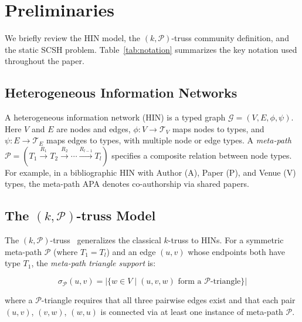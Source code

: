 \section{Preliminaries}

We briefly review the HIN model, the $(k,\mathcal{P})$-truss community definition, and the static SCSH problem. Table~\ref{tab:notation} summarizes the key notation used throughout the paper.

\subsection{Heterogeneous Information Networks}

A heterogeneous information network (HIN) is a typed graph $\mathcal{G} = (V,E,\phi,\psi)$. Here $V$ and $E$ are nodes and edges, $\phi:V\rightarrow\mathcal{T}_V$ maps nodes to types, and $\psi:E\rightarrow\mathcal{T}_E$ maps edges to types, with multiple node or edge types. A \emph{meta-path} $\mathcal{P} = (T_1 \xrightarrow{R_1} T_2 \xrightarrow{R_2} \cdots \xrightarrow{R_{l-1}} T_l)$ specifies a composite relation between node types. For example, in a bibliographic HIN with Author (A), Paper (P), and Venue (V) types, the meta-path APA denotes co-authorship via shared papers.

\subsection[The k,P-truss Model]{The $(k,\mathcal{P})$-truss Model}

The $(k,\mathcal{P})$-truss~\cite{zhang2025scsh} generalizes the classical $k$-truss to HINs. For a symmetric meta-path $\mathcal{P}$ (where $T_1 = T_l$) and an edge $(u,v)$ whose endpoints both have type $T_1$, the \emph{meta-path triangle support} is:

\begin{equation}
\sigma_{\mathcal{P}}(u,v) = \big|\{ w \in V \mid (u,v,w) \text{ form a $\mathcal{P}$-triangle} \}\big|
\label{eq:support}
\end{equation}

where a $\mathcal{P}$-triangle requires that all three pairwise edges exist and that each pair $(u,v)$, $(v,w)$, $(w,u)$ is connected via at least one instance of meta-path $\mathcal{P}$.


